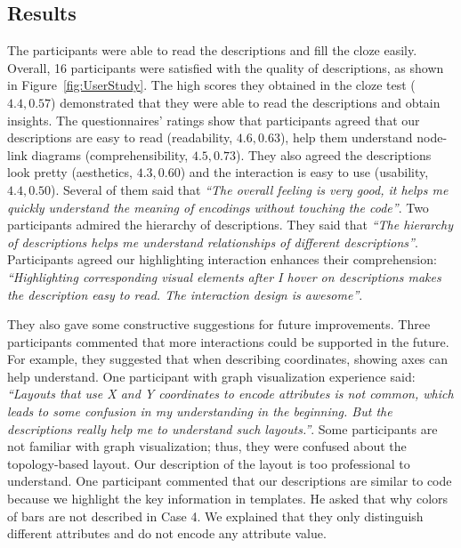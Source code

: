 
\subsection{Results}
The participants were able to read the descriptions and fill the cloze easily.
Overall, 16 participants were satisfied with the quality of descriptions, as shown in Figure~\ref{fig:UserStudy}.
The high scores they obtained in the cloze test ($4.4, 0.57$) demonstrated that they were able to read the descriptions and obtain insights.
The questionnaires' ratings show that participants agreed that our descriptions are easy to read (readability, $4.6, 0.63$), help them understand node-link diagrams (comprehensibility, $4.5, 0.73$).
They also agreed the descriptions look pretty (aesthetics, $4.3, 0.60$) and the interaction is easy to use (usability, $4.4, 0.50$).
Several of them said that \textit{``The overall feeling is very good, it helps me quickly understand the meaning of encodings without touching the code''}.
Two participants admired the hierarchy of descriptions.
They said that \textit{``The hierarchy of descriptions helps me understand relationships of different descriptions''}.
Participants agreed our highlighting interaction enhances their comprehension: \textit{``Highlighting corresponding visual elements after I hover on descriptions makes the description easy to read. The interaction design is awesome''}.

They also gave some constructive suggestions for future improvements.
Three participants commented that more interactions could be supported in the future.
For example, they suggested that when describing coordinates, showing axes can help understand.
One participant with graph visualization experience said: \textit{``Layouts that use X and Y coordinates to encode attributes is not common, which leads to some confusion in my understanding in the beginning. But the descriptions really help me to understand such layouts.''}.
Some participants are not familiar with graph visualization; thus, they were confused about the topology-based layout.
Our description of the layout is too professional to understand.
One participant commented that our descriptions are similar to code because we highlight the key information in templates.
He asked that why colors of bars are not described in Case 4.
We explained that they only distinguish different attributes and do not encode any attribute value.



